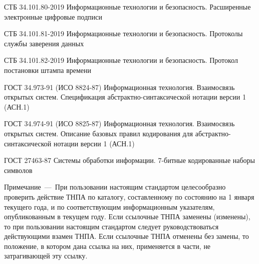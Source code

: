 СТБ 34.101.80-2019 
Информационные технологии и безопасность. 
Расширенные электронные цифровые подписи

СТБ 34.101.81-2019 
Информационные технологии и безопасность. 
Протоколы службы заверения данных

СТБ 34.101.82-2019 
Информационные технологии и безопасность. 
Протокол постановки штампа времени

ГОСТ 34.973-91 (ИСО 8824-87) Информационная технология. Взаимосвязь 
открытых систем. Спецификация абстрактно-синтаксической нотации версии 1 
(АСН.1) 

ГОСТ 34.974-91 (ИСО 8825-87) Информационная технология. Взаимосвязь 
открытых систем. Описание базовых правил кодирования для 
абстрактно-синтаксической нотации версии 1 (АСН.1) 

ГОСТ 27463-87 Системы обработки информации. 
7-битные кодированные наборы символов

\begin{note}
Примечание~---~При пользовании настоящим стандартом
целесообразно проверить действие ТНПА 
по каталогу, составленному по состоянию на 1 января текущего
года, и по соответствующим информационным указателям, опубликованным
в текущем году. Если ссылочные ТНПА заменены (изменены), то при
пользовании настоящим стандартом следует руководствоваться
действующими взамен ТНПА. Если ссылочные ТНПА отменены без
замены, то положение, в котором дана ссылка на них, применяется в
части, не затрагивающей эту ссылку.
\end{note}
